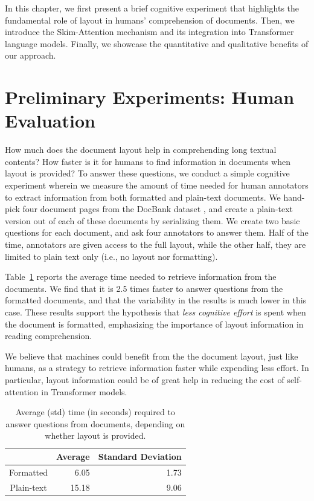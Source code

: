 In this chapter, we first present a brief cognitive experiment that highlights the fundamental role of layout in humans' comprehension of documents. Then, we introduce the Skim-Attention mechanism and its integration into Transformer language models. Finally, we showcase the quantitative and qualitative benefits of our approach.


\section{Preliminary Experiments: Human Evaluation}
\label{section:chapter3-human-evaluation}

How much does the document layout help in comprehending long textual contents? How faster is it for humans to find information in documents when layout is provided? To answer these questions, we conduct a simple cognitive experiment wherein we measure the amount of time needed for human annotators to extract information from both formatted and plain-text documents. We hand-pick four document pages from the DocBank dataset \citep{li2020docbank}, and create a plain-text version out of each of these documents by serializing them. We create two basic questions for each document, and ask four annotators to answer them. Half of the time, annotators are given access to the full layout, while the other half, they are limited to plain text only (i.e., no layout nor formatting).

Table~\ref{tab:chapter3-human-eval} reports the average time needed to retrieve information from the documents. We find that it is 2.5 times faster to answer questions from the formatted documents, and that the variability in the results is much lower in this case. These results support the hypothesis that \emph{less cognitive effort} is spent when the document is formatted, emphasizing the importance of layout information in reading comprehension.

We believe that machines could benefit from the the document layout, just like humans, as a strategy to retrieve information faster while expending less effort. In particular, layout information could be of great help in reducing the cost of self-attention in Transformer models.

\begin{table}
\centering \small
    \begin{tabular}{crr}
        \hline
                   & \textbf{Average} & \textbf{Standard Deviation} \\
        \hline 
        Formatted  & 6.05  & 1.73 \\
        Plain-text & 15.18 & 9.06 \\
        \hline
    \end{tabular}
\caption{Average (std) time (in seconds) required to answer questions from documents, depending on whether layout is provided.}
\label{tab:chapter3-human-eval}
\end{table}

